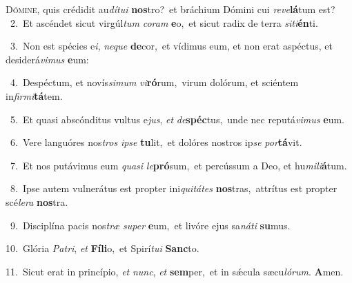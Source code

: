 \lettrine{\initial\textcolor{\initialcolor}{D}}{ómine,} quis crédidit au\-\textit{dí}\-\textit{tu}\textit{i} \textbf{nos}\-tro?~\star et bráchium Dómini cui \textit{re}\-\textit{ve}\textbf{lá}tum est?\\
{\numbfont\textcolor{\numbcolor}{~2.}}~Et ascéndet sicut virgúl\textit{tum} \textit{co}\-\textit{ram} \textbf{e}\-o,~\star et sicut radix de terra \textit{si}\-\textit{ti}\textbf{én}ti.\par
{\numbfont\textcolor{\numbcolor}{~3.}}~Non est spécies e\-\textit{i}\-, \textit{ne}\-\textit{que} \textbf{de}\-cor,~\star et vídimus eum, et non erat aspéctus, et desiderá\-\textit{vi}\-\textit{mus} \textbf{e}\-um:\par
{\numbfont\textcolor{\numbcolor}{~4.}}~Despéctum, et novís\-\textit{si}\-\textit{mum} \textit{vi}\-\textbf{ró}rum,~\star virum dolórum, et sciéntem in\-\textit{fir}\-\textit{mi}\textbf{tá}tem.\par
{\numbfont\textcolor{\numbcolor}{~5.}}~Et quasi abscónditus vultus e\-\textit{jus}\-, \textit{et} \textit{de}\-\textbf{spéc}tus,~\star unde nec reputá\-\textit{vi}\-\textit{mus} \textbf{e}\-um.\par
{\numbfont\textcolor{\numbcolor}{~6.}}~Vere languóres nos\textit{tros} \textit{ip}\-\textit{se} \textbf{tu}\-lit,~\star et dolóres nostros ip\textit{se} \textit{por}\-\textbf{tá}vit.\par
{\numbfont\textcolor{\numbcolor}{~7.}}~Et nos putávimus eum \textit{qua}\-\textit{si} \textit{le}\-\textbf{pró}sum,~\star et percússum a Deo, et hu\-\textit{mi}\-\textit{li}\textbf{á}tum.\par
{\numbfont\textcolor{\numbcolor}{~8.}}~Ipse autem vulnerátus est propter ini\-\textit{qui}\-\textit{tá}\textit{tes} \textbf{nos}\-tras,~\star attrítus est propter scé\-\textit{le}\-\textit{ra} \textbf{nos}\-tra.\par
{\numbfont\textcolor{\numbcolor}{~9.}}~Disciplína pacis nos\textit{træ} \textit{su}\-\textit{per} \textbf{e}\-um,~\star et livóre ejus sa\-\textit{ná}\-\textit{ti} \textbf{su}\-mus.\par
{\numbfont\textcolor{\numbcolor}{10.}}~Glória \textit{Pa}\-\textit{tri}, \textit{et} \textbf{Fí}\-\textbf{li}o,~\star et Spirí\-\textit{tu}\-\textit{i} \textbf{Sanc}\-to.\par
{\numbfont\textcolor{\numbcolor}{11.}}~Sicut erat in princípio, \textit{et} \textit{nunc}\-, \textit{et} \textbf{sem}\-per,~\star et in sǽcula sæcu\-\textit{ló}\-\textit{rum}. \textbf{A}\-men.\par
